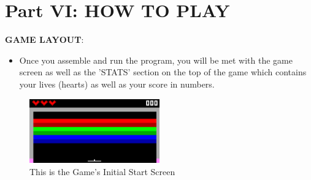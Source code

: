 \documentclass{article}
\begin{document}
\newpage
\section{Part VI: HOW TO PLAY}

\textbf{GAME LAYOUT}:
\begin{itemize}
    \item Once you assemble and run the program, you will be met with the game screen as well as the 'STATS' section on the top of the game which contains your lives (hearts) as well as your score in numbers.
\end{itemize}

\begin{figure}[ht!]
    \centering
    \includegraphics[width=0.5\textwidth]{game_start.png}
    \caption{This is the Game's Initial Start Screen}
    \label{f:Initial Start Screen}
\end{figure}
\end{document}
